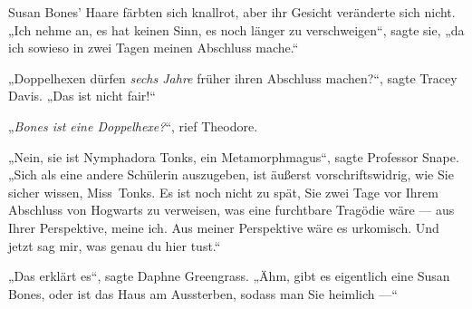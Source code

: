 Susan Bones’ Haare färbten sich knallrot, aber ihr Gesicht veränderte sich nicht.
„Ich nehme an, es hat keinen Sinn, es noch länger zu verschweigen“, sagte sie, „da ich sowieso in zwei Tagen meinen Abschluss mache.“

„Doppelhexen dürfen \emph{sechs Jahre} früher ihren Abschluss machen?“, sagte Tracey Davis.
„Das ist nicht fair!“

„\emph{Bones ist eine Doppelhexe?}“, rief Theodore.

„Nein, sie ist Nymphadora Tonks, ein Metamorphmagus“, sagte Professor Snape.
„Sich als eine andere Schülerin auszugeben, ist äußerst vorschriftswidrig, wie Sie sicher wissen, Miss~Tonks. Es ist noch nicht zu spät, Sie zwei Tage vor Ihrem Abschluss von Hogwarts zu verweisen, was eine furchtbare Tragödie wäre — aus Ihrer Perspektive, meine ich. Aus meiner Perspektive wäre es urkomisch. Und jetzt sag mir, was genau du hier tust.“

„Das erklärt es“, sagte Daphne Greengrass.
„Ähm, gibt es eigentlich eine Susan Bones, oder ist das Haus am Aussterben, sodass man Sie heimlich —“

